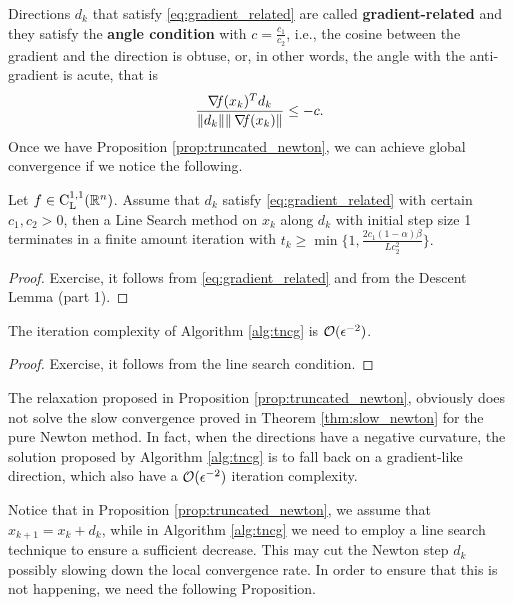 \documentclass[10pt,a4paper]{article}
\begin{document}
\noindent Directions $d_k$ that satisfy \eqref{eq:gradient_related} are called \textbf{gradient-related} and they satisfy the \textbf{angle condition} with $c=\frac{c_1}{c_2}$, i.e., the cosine between the gradient and the direction is obtuse, or, in other words, the angle with the anti-gradient is acute, that is
$$ 	\frac{\operatorname*{\mathit{\nabla \!f}}(x_k)^T d_k}{\|d_k\|\|\operatorname*{\mathit{\nabla \!f}}(x_k)\|} \leq -c.$$
Once we have Proposition \ref{prop:truncated_newton}, we can achieve global convergence if we notice the following. 
\begin{lemma} Let $f\in \mathord{\mathrm{C^{1,1}_{L}}}(\mathbb{R}^n)$. Assume that $d_k$ satisfy \eqref{eq:gradient_related} with certain $c_1, c_2>0$, then a Line Search method on $x_k$ along $d_k$ with initial step size 1 terminates in a finite amount iteration with $t_k\geq \min \{1, \frac{2c_1(1-\alpha)\beta}{Lc_2^2}\}.$
\end{lemma}
\begin{proof}
	Exercise, it follows from \eqref{eq:gradient_related} and from the Descent Lemma (part 1).
\end{proof}
\begin{corollary}
	The iteration complexity of Algorithm \ref{alg:tncg} is $\mathcal{O}(\epsilon^{-2})$.
\end{corollary}
\begin{proof}
	Exercise, it follows from the line search condition.
\end{proof}
\begin{remark}
	The relaxation proposed in Proposition \ref{prop:truncated_newton}, obviously does not solve the slow convergence proved in Theorem \ref{thm:slow_newton} for the pure Newton method. In fact, when the directions have a negative curvature, the solution proposed by Algorithm \ref{alg:tncg} is to fall back on a gradient-like direction, which also have a $\mathcal{O}(\epsilon^{-2})$ iteration complexity. 
\end{remark}
\noindent Notice that in Proposition \ref{prop:truncated_newton}, we assume that $x_{k+1} = x_k + d_k$, while in Algorithm \ref{alg:tncg} we need to employ a line search technique to ensure a sufficient decrease. This may cut the Newton step $d_k$ possibly slowing down the local convergence rate. In order to ensure that this is not happening, we need the following Proposition. 
\end{document}
